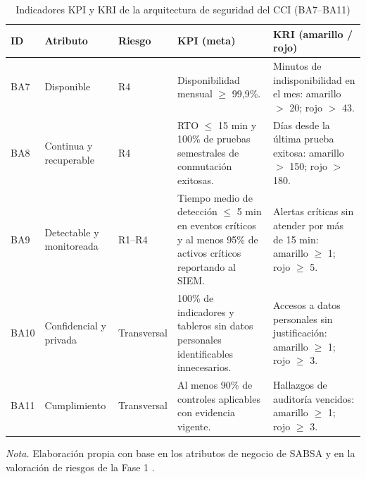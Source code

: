 \begin{table}[H]
	\centering
	\caption{Indicadores KPI y KRI de la arquitectura de seguridad del CCI (BA7--BA11)}
	\label{tab:kpi_kri_2}
	
	\begingroup
	\scriptsize
	\setlength{\tabcolsep}{3pt}
	\renewcommand{\arraystretch}{1.12}
	
	\begin{tabularx}{\textwidth}{
			>{\centering\arraybackslash}p{0.8cm}
			>{\raggedright\arraybackslash}p{2.0cm}
			>{\centering\arraybackslash}p{1.4cm}
			Y
			Y}
		
		\toprule
		\textbf{ID} &
		\textbf{Atributo} &
		\textbf{Riesgo} &
		\textbf{KPI (meta)} &
		\textbf{KRI (amarillo / rojo)} \\
		\midrule
		
		BA7 &
		Disponible &
		R4 &
		Disponibilidad mensual $\geq$ 99,9\%. &
		Minutos de indisponibilidad en el mes: amarillo $>$ 20; rojo $>$ 43. \\
		
		\addlinespace[2pt]
		
		BA8 &
		Continua y recuperable &
		R4 &
		RTO $\leq$ 15 min y 100\% de pruebas semestrales de conmutación exitosas. &
		Días desde la última prueba exitosa: amarillo $>$ 150; rojo $>$ 180. \\
		
		\addlinespace[2pt]
		
		BA9 &
		Detectable y monitoreada &
		R1--R4 &
		Tiempo medio de detección $\leq$ 5 min en eventos críticos y al menos 95\% de
		activos críticos reportando al SIEM. &
		Alertas críticas sin atender por más de 15 min: amarillo $\geq$ 1; rojo $\geq$ 5. \\
		
		\addlinespace[2pt]
		
		BA10 &
		Confidencial y privada &
		Transversal &
		100\% de indicadores y tableros sin datos personales identificables innecesarios. &
		Accesos a datos personales sin justificación: amarillo $\geq$ 1; rojo $\geq$ 3. \\
		
		\addlinespace[2pt]
		
		BA11 &
		Cumplimiento &
		Transversal &
		Al menos 90\% de controles aplicables con evidencia vigente. &
		Hallazgos de auditoría vencidos: amarillo $\geq$ 1; rojo $\geq$ 3. \\
		
		\bottomrule
	\end{tabularx}
	
	\vspace{0.4em}
	\parbox{\textwidth}{\footnotesize \textit{Nota.} Elaboración propia con base en los atributos de negocio de SABSA \parencite{sabsa2005,sabsaCCI2026} y en la valoración de riesgos de la Fase 1 \parencite{fase1cci2026}.}
	
	\endgroup
\end{table}


